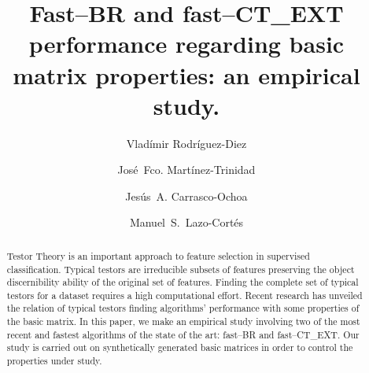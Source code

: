 \documentclass[citeauthoryear]{llncs}
\begin{document}
\mainmatter              %
%
\title{Fast--BR and fast--CT\_EXT performance regarding basic matrix properties: an empirical study.}
%
			 
\author{Vlad\'{i}mir Rodr\'{i}guez-Diez \and Jos\'{e}~Fco. Mart\'{i}nez-Trinidad
		 \and Jes\'{u}s~A. Carrasco-Ochoa \and Manuel~S.~Lazo-Cortés}
%
%
%


\maketitle              %

\begin{abstract}
	Testor Theory is an important approach to feature selection in supervised classification. Typical testors are irreducible subsets of features preserving the object discernibility ability of the original set of features. 
	Finding the complete set of typical testors for a dataset requires a high computational effort. Recent research has unveiled the relation of typical testors finding algorithms' performance with some properties of the basic matrix. In this paper, we make an empirical study involving two of the most recent and fastest algorithms of the state of the art: fast--BR and fast--CT\_EXT. Our study is carried out on synthetically generated basic matrices in order to control the properties under study.

\end{abstract}
%
\end{document}
